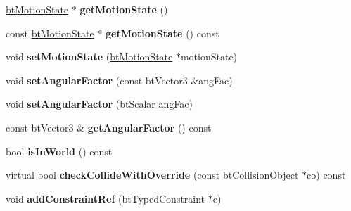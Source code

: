 \begin{DoxyCompactItemize}
\item 
\hypertarget{classbt_rigid_body_a2bbea712d9095f05ff3b031bbe4e6521}{\hyperlink{classbt_motion_state}{bt\+Motion\+State} $\ast$ {\bfseries get\+Motion\+State} ()}\label{classbt_rigid_body_a2bbea712d9095f05ff3b031bbe4e6521}

\item 
\hypertarget{classbt_rigid_body_a23617f6b31c916e4f037dfd461cb2290}{const \hyperlink{classbt_motion_state}{bt\+Motion\+State} $\ast$ {\bfseries get\+Motion\+State} () const }\label{classbt_rigid_body_a23617f6b31c916e4f037dfd461cb2290}

\item 
\hypertarget{classbt_rigid_body_ac8272055c40ba4bb794fc5f1cb105d54}{void {\bfseries set\+Motion\+State} (\hyperlink{classbt_motion_state}{bt\+Motion\+State} $\ast$motion\+State)}\label{classbt_rigid_body_ac8272055c40ba4bb794fc5f1cb105d54}

\item 
\hypertarget{classbt_rigid_body_aa2061f3fd87043f2a3b8c68ee74847cb}{void {\bfseries set\+Angular\+Factor} (const bt\+Vector3 \&ang\+Fac)}\label{classbt_rigid_body_aa2061f3fd87043f2a3b8c68ee74847cb}

\item 
\hypertarget{classbt_rigid_body_acf721bf585c46cf0243cbbda1fc4379d}{void {\bfseries set\+Angular\+Factor} (bt\+Scalar ang\+Fac)}\label{classbt_rigid_body_acf721bf585c46cf0243cbbda1fc4379d}

\item 
\hypertarget{classbt_rigid_body_acf7cb3d3ad86818eb0f33e3226bc5105}{const bt\+Vector3 \& {\bfseries get\+Angular\+Factor} () const }\label{classbt_rigid_body_acf7cb3d3ad86818eb0f33e3226bc5105}

\item 
\hypertarget{classbt_rigid_body_a2b4132f810c3095755601d0275ae918b}{bool {\bfseries is\+In\+World} () const }\label{classbt_rigid_body_a2b4132f810c3095755601d0275ae918b}

\item 
\hypertarget{classbt_rigid_body_a5d71620b047262ef0db092126e7dcb7c}{virtual bool {\bfseries check\+Collide\+With\+Override} (const bt\+Collision\+Object $\ast$co) const }\label{classbt_rigid_body_a5d71620b047262ef0db092126e7dcb7c}

\item 
\hypertarget{classbt_rigid_body_a1c89df31d2a10f06cc81da0e4b573297}{void {\bfseries add\+Constraint\+Ref} (bt\+Typed\+Constraint $\ast$c)}\label{classbt_rigid_body_a1c89df31d2a10f06cc81da0e4b573297}


\end{DoxyCompactItemize}
